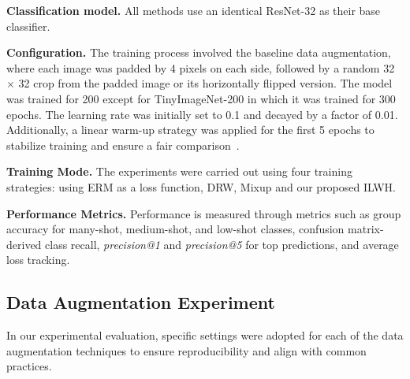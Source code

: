\textbf{Classification model.}
All methods use an identical ResNet-32 \cite{he2016deep} as their base classifier.

\textbf{Configuration.}
The training process involved the baseline data augmentation, where each image was padded by 4 pixels on each side, followed by a random 32 × 32 crop from the padded image or its horizontally flipped version. The model was trained for 200 except for TinyImageNet-200 in which it was trained for 300 epochs. The learning rate was initially set to 0.1 and decayed by a factor of 0.01. Additionally, a linear warm-up strategy was applied for the first 5 epochs to stabilize training and ensure a fair comparison~\cite{goyal2017accurate}. 

\textbf{Training Mode.}
The experiments were carried out using four training strategies: using ERM as a loss function, DRW, Mixup and our proposed ILWH.

\textbf{Performance Metrics.}
Performance is measured through metrics such as group accuracy for many-shot, medium-shot, and low-shot classes, confusion matrix-derived class recall, \textit{precision@1} and \textit{precision@5} for top predictions, and average loss tracking.

\subsection{Data Augmentation Experiment}
In our experimental evaluation, specific settings were adopted for each of the data augmentation techniques to ensure reproducibility and align with common practices.

